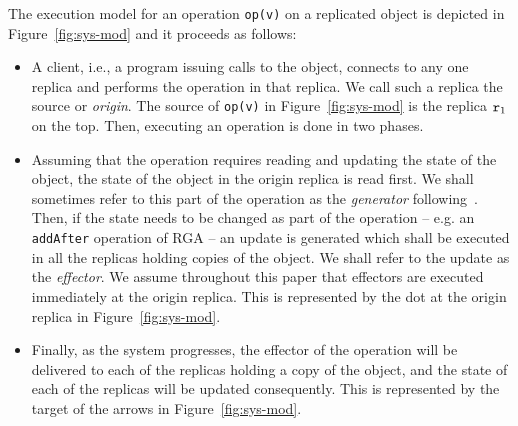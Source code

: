 The execution model for an operation \lstinline|op(v)| on a replicated object is depicted in Figure~\ref{fig:sys-mod} and it proceeds as follows:
\begin{itemize}
\item A client, i.e., a program issuing calls to the object, connects
  to any one replica %
  and performs the operation in that replica. We call such a
  replica the source or \emph{origin}. The source of \lstinline|op(v)|
  in Figure~\ref{fig:sys-mod} is the replica $\mathtt{r}_1$ on the top.
  Then, executing an operation is done in two phases.
\item Assuming that the operation requires reading and updating the
  state of the object, the state of the object in the origin replica is
  read first.
  We shall sometimes refer to this part of the operation as the
  \emph{generator} following~\cite{ShapiroPBZ11}.
  Then, if the state needs to be changed as part of the operation --
  e.g. an \lstinline|addAfter| operation of RGA -- an update is
  generated which shall be executed in all the replicas holding copies of the
  object.
  We shall refer to the update as the \emph{effector}.
  We assume throughout this paper that effectors are executed
  immediately at the origin replica.
  This is represented by the dot at the origin replica
  in Figure~\ref{fig:sys-mod}.
\item Finally, as the system progresses, the effector of the operation
  will be delivered to each of the replicas holding a copy of the
  object, and the state of each of the replicas will be updated
  consequently.
  This is represented by the target of the arrows
  in Figure~\ref{fig:sys-mod}.
\end{itemize}

